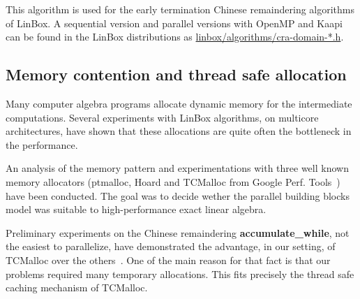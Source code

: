 \documentclass[runningheads,a4paper]{llncs}
\newcommand{\linboxsp}{{\sc LinBox}\xspace}
\newcommand{\linbox}{{\sc LinBox}}
\begin{document}
  This algorithm is used 
  for the early termination Chinese remaindering algorithms of
  \linbox. A sequential version and parallel versions with OpenMP and
  Kaapi can be found in the \linboxsp distributions as 
  \url{linbox/algorithms/cra-domain-*.h}.



\subsection{Memory contention and thread safe allocation}
Many computer algebra programs allocate dynamic memory for the
intermediate computations. Several experiments with \linboxsp
algorithms, on multicore architectures, have shown that these
allocations are quite often the bottleneck in the performance.

An analysis of the memory pattern and experimentations with three well
known memory allocators 
(ptmalloc, Hoard and TCMalloc from Google Perf. Tools~\cite{tcmalloc})
have been conducted. The goal was to decide wether the parallel
building blocks model was suitable to high-performance exact linear
algebra.

Preliminary experiments on the Chinese remaindering {\bf accumulate\_while},
not the easiest to parallelize, have demonstrated the advantage, in
our setting, of TCMalloc over the others~\cite{jgd:2010:crt}.
One of the main reason for that fact is that our problems required
many temporary allocations. This fits precisely the thread safe caching
mechanism of TCMalloc.
\end{document}
